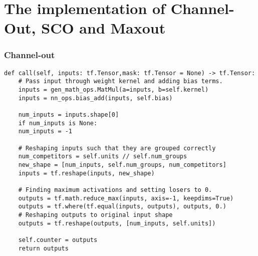 \section{The implementation of Channel-Out, \ac{SCO} and Maxout}

\subsubsection*{Channel-out}
\lstset{style=Python}
\begin{lstlisting}[caption={Python implementation for the custom activation function used to define the channel-out layer.},captionpos=b, label={lst:channel_out}]
def call(self, inputs: tf.Tensor,mask: tf.Tensor = None) -> tf.Tensor:
    # Pass input through weight kernel and adding bias terms.
    inputs = gen_math_ops.MatMul(a=inputs, b=self.kernel)
    inputs = nn_ops.bias_add(inputs, self.bias)

    num_inputs = inputs.shape[0]
    if num_inputs is None:
    num_inputs = -1

    # Reshaping inputs such that they are grouped correctly
    num_competitors = self.units // self.num_groups
    new_shape = [num_inputs, self.num_groups, num_competitors]
    inputs = tf.reshape(inputs, new_shape)

    # Finding maximum activations and setting losers to 0.
    outputs = tf.math.reduce_max(inputs, axis=-1, keepdims=True)
    outputs = tf.where(tf.equal(inputs, outputs), outputs, 0.)
    # Reshaping outputs to original input shape
    outputs = tf.reshape(outputs, [num_inputs, self.units])

    self.counter = outputs
    return outputs 
\end{lstlisting}

